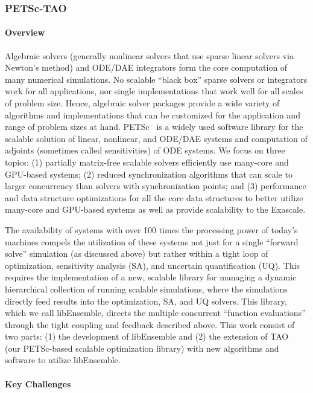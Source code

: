 \subsubsection{ PETSc-TAO} \label{subsubsect:petsc}
\paragraph{Overview} 

Algebraic solvers (generally nonlinear solvers that use sparse linear solvers via Newton's method) and ODE/DAE 
integrators form the core computation of many numerical simulations. No scalable ``black box'' sparse solvers 
or integrators work for all applications, nor single implementations that work well for all scales of 
problem size. Hence, algebraic solver packages provide a wide variety of algorithms and implementations 
that can be customized for the application and range of problem sizes at hand. PETSc~\cite{petsc:homepage,petsc-man} 
is a widely used software library for the scalable solution of linear, nonlinear, and ODE/DAE systems and 
computation of adjoints (sometimes called sensitivities) of ODE systems. We focus on three topics: (1) partially 
matrix-free scalable solvers efficiently use many-core and GPU-based systems; (2) reduced synchronization 
algorithms that can scale to larger concurrency than solvers with synchronization points; and (3) performance 
and data structure optimizations for all the core data structures to better utilize many-core and GPU-based 
systems as well as provide scalability to the Exascale.

The availability of systems with over 100 times the processing power of today's machines compels the utilization 
of these systems not just for a single ``forward solve'' simulation (as discussed above) but rather within a 
tight loop of optimization, sensitivity analysis (SA), and uncertain quantification (UQ). This requires the 
implementation of a new, scalable library for managing a dynamic hierarchical collection of running scalable simulations, where the simulations directly feed results into the optimization, SA, and UQ solvers.  This library, 
which we call libEnsemble, directs the multiple concurrent ``function evaluations'' through the tight coupling 
and feedback described above. This work consist of two parts: (1) the development of libEnsemble and (2) the 
extension of TAO~\cite{tao-man} (our PETSc-based scalable optimization library) with new algorithms and 
software to utilize libEnsemble.

\paragraph{Key Challenges}

